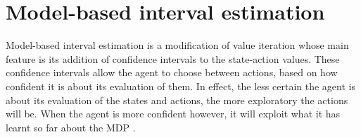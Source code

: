 \section{Model-based interval estimation}
\label{sec:mbie}

Model-based interval estimation is a modification of value iteration whose main feature is its  addition of confidence
intervals to the state-action values. These confidence intervals allow the agent to choose between
actions, based on how confident it is about its evaluation of them. In effect,
the less certain the agent is about its evaluation of the states and actions,
the more exploratory the actions will be. When the agent is more confident
however, it will exploit what it has learnt so far about the MDP
\parencite{dietterich2013pac}.




